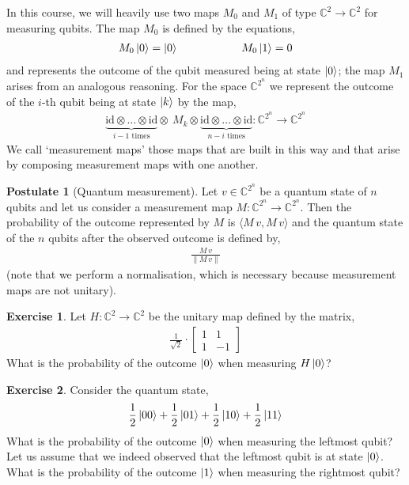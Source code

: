\documentclass[a4paper, 11pt]{article}
\newcommand{\complex}{\mathbb{C}}
\newcommand{\id}{\mathrm{id}}
\theoremstyle{definition}
\newtheorem{exercise}{Exercise}
\newtheorem{postulate}{Postulate}
\begin{document}
In this course, we will heavily use two maps $M_0$ and $M_1$ of type
$\complex^2 \to \complex^2$ for measuring qubits. The map $M_0$ is
defined by the equations,
\begin{align*}
  M_0 \ket{0} = \ket{0} \hspace{2cm} M_0 \ket{1} = 0
\end{align*}
and represents the outcome of the qubit measured being at state
$\ket{0}$; the map $M_1$ arises from an analogous reasoning. For the
space $\complex^{2^n}$ we represent the outcome of the $i$-th
qubit being at state $\ket{k}$ by the map,
\begin{align*}
  \underbrace{\id \otimes \dots \otimes \id}_{i-1 \text{ times}} \otimes\ M_k \otimes
  \underbrace{\id \otimes \dots \otimes \id}_{n - i  \text{ times}}
  : \complex^{2^n} \to \complex^{2^n}
\end{align*}
We call `measurement maps' those maps that are built in this way and
that arise by composing measurement maps with one another.

\begin{postulate}[Quantum measurement]
  Let $v \in \complex^{2^n}$ be a quantum state of $n$ qubits and let
  us consider a measurement map
  $M : \complex^{2^n} \to \complex^{2^n}$. Then the probability of the
  outcome represented by $M$ is $\langle M \, v, M \, v \rangle$ and the
  quantum state of the $n$ qubits after the observed outcome is
  defined by,
  \begin{align*}
    \frac{M \, v}{\| M \, v \|}
  \end{align*}
  (note that we perform a normalisation, which is necessary because
  measurement maps are not unitary).
\end{postulate}

\begin{exercise}
  Let $H : \complex^2 \to \complex^2$ be the unitary map defined by
  the matrix,
  \begin{align*} \frac{1}{\sqrt{2}} \cdot
     \begin{bmatrix}
       1 & 1 \\
       1 & -1
  \end{bmatrix}
  \end{align*}
  What is the probability of the outcome $\ket{0}$ when measuring
  $H \ket{0}$?
\end{exercise}

\begin{exercise}
  Consider the quantum state,
  \begin{align*}
    \frac{1}{2} \ket{00} + \frac{1}{2} \ket{01} + \frac{1}{2} \ket{10} +
    \frac{1}{2} \ket{11}
  \end{align*}
  What is the probability of the outcome $\ket{0}$ when measuring the
  leftmost qubit? Let us assume that we indeed observed that the
  leftmost qubit is at state $\ket{0}$. What is the probability of
  the outcome $\ket{1}$ when measuring the rightmost qubit?
\end{exercise}
\end{document}
